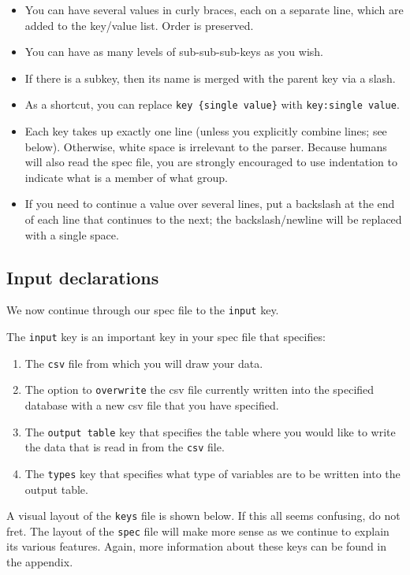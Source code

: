 \documentclass{article}
\begin{document}
\begin{itemize}
\item You can have several values in curly braces, each on a separate line, which are added to the key/value list. Order is preserved.
\item You can have as many levels of sub-sub-sub-keys as you wish.
\item If there is a subkey, then its name is merged with the parent key via a slash.
\item As a shortcut, you can replace {\tt key \{single value\}} with {\tt key:single value}.
\item Each key takes up exactly one line (unless you explicitly combine lines; see below). Otherwise, white
space is irrelevant to the parser. Because humans will also read the spec file, you
are strongly encouraged to use indentation to indicate what is a member of what group.
\item If you need to continue a value over several lines, put a backslash at the end of
each line that continues to the next; the backslash/newline will be replaced with a single space.
\end{itemize}


\subsection{Input declarations}
We now continue through our spec file to the {\tt input} key.

The {\tt input} key is an important key in your spec file that specifies:
\begin{enumerate}
\item The {\tt csv} file from which you will draw your data.
\item The option to \texttt{overwrite} the csv file currently written into the specified database with 
a new csv file that you have specified.
\item The {\tt output table} key that specifies the table where you would like to 
write the data that is read in from the {\tt csv} file.
\item The {\tt types} key that specifies what type of variables are to be written 
into the output table.
\end{enumerate}

A visual layout of the {\tt keys} file is shown below. If this all seems confusing, do not fret. The layout of the {\tt spec} file will make more sense as we continue to explain its various features. Again, 
  more information about these keys can be found in the appendix.\\
\end{document}
